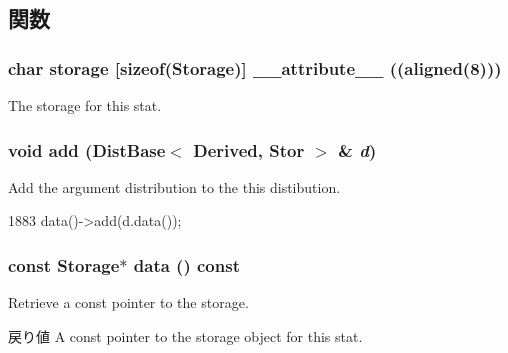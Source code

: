 \subsection{関数}
\hypertarget{classStats_1_1DistBase_a72ec214acf2091c80c5794662602c42f}{
\subsubsection[{\_\-\_\-attribute\_\-\_\-}]{\setlength{\rightskip}{0pt plus 5cm}char storage \mbox{[}sizeof({\bf Storage})\mbox{]} \_\-\_\-attribute\_\-\_\- ((aligned(8)))}}
\label{classStats_1_1DistBase_a72ec214acf2091c80c5794662602c42f}
The storage for this stat. \hypertarget{classStats_1_1DistBase_ac09dc41d5446f9395c5e4426eee18c17}{
\subsubsection[{add}]{\setlength{\rightskip}{0pt plus 5cm}void add ({\bf DistBase}$<$ Derived, Stor $>$ \& {\em d})}}
\label{classStats_1_1DistBase_ac09dc41d5446f9395c5e4426eee18c17}
Add the argument distribution to the this distibution. 


\begin{DoxyCode}
1883 { data()->add(d.data()); }
\end{DoxyCode}
\hypertarget{classStats_1_1DistBase_aabedc9303ac5bae8af18ceaeeb7fe44b}{
\subsubsection[{data}]{\setlength{\rightskip}{0pt plus 5cm}const {\bf Storage}$\ast$ data () const}}
\label{classStats_1_1DistBase_aabedc9303ac5bae8af18ceaeeb7fe44b}
Retrieve a const pointer to the storage. \begin{DoxyReturn}{戻り値}
A const pointer to the storage object for this stat. 
\end{DoxyReturn}



